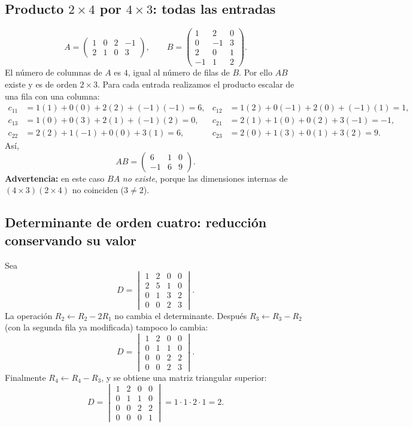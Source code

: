 \documentclass[12pt]{article}
\theoremstyle{remark}
\begin{document}
\subsection*{Producto $2\times4$ por $4\times3$: todas las entradas}
\[
A=\begin{pmatrix}1&0&2&-1\\2&1&0&3\end{pmatrix},\qquad
B=\begin{pmatrix}1&2&0\\0&-1&3\\2&0&1\\-1&1&2\end{pmatrix}.
\]
El número de columnas de $A$ es $4$, igual al número de filas de $B$. Por ello $AB$ existe y es de orden $2\times3$. Para cada entrada realizamos el producto escalar de una fila con una columna:
\begin{align*}
c_{11}&=1(1)+0(0)+2(2)+(-1)(-1)=6, &c_{12}&=1(2)+0(-1)+2(0)+(-1)(1)=1,\\
c_{13}&=1(0)+0(3)+2(1)+(-1)(2)=0, &c_{21}&=2(1)+1(0)+0(2)+3(-1)=-1,\\
c_{22}&=2(2)+1(-1)+0(0)+3(1)=6, &c_{23}&=2(0)+1(3)+0(1)+3(2)=9.
\end{align*}
Así,
\[\boxed{AB=\begin{pmatrix}6&1&0\\-1&6&9\end{pmatrix}.}\]
\textbf{Advertencia:} en este caso $BA$ \emph{no existe}, porque las dimensiones internas de $(4\times3)(2\times4)$ no coinciden ($3\ne2$).
\subsection*{Determinante de orden cuatro: reducción conservando su valor}
Sea
\[
D=\begin{vmatrix}
1&2&0&0\\
2&5&1&0\\
0&1&3&2\\
0&0&2&3
\end{vmatrix}.
\]
La operación $R_2\leftarrow R_2-2R_1$ no cambia el determinante. Después $R_3\leftarrow R_3-R_2$ (con la segunda fila ya modificada) tampoco lo cambia:
\[
D=\begin{vmatrix}1&2&0&0\\0&1&1&0\\0&0&2&2\\0&0&2&3\end{vmatrix}.
\]
Finalmente $R_4\leftarrow R_4-R_3$, y se obtiene una matriz triangular superior:
\[
D=\begin{vmatrix}1&2&0&0\\0&1&1&0\\0&0&2&2\\0&0&0&1\end{vmatrix}
=1\cdot1\cdot2\cdot1=\boxed{2}.
\]
\end{document}
